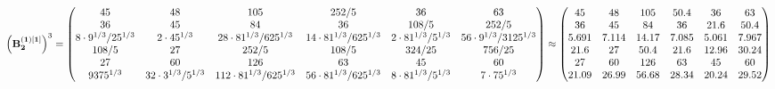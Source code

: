 \documentclass[10pt,a4paper]{article}
\begin{document}
	\[
		\left(\bold{B_2^{(1)[1]}}\right)^{3} = 
		\begin{pmatrix}
			{{45}}{} & {{48}}{} & {{105}}{} & {{252}} / {{5}} & {{36}}{} & {{63}}{} \\
			{{36}}{} & {{45}}{} & {{84}}{} & {{36}}{} & {{108}} / {{5}} & {{252}} / {{5}} \\
			{{8} \cdot {9^ {1 / 3}}} / {{25^ {1 / 3}}} & {{2} \cdot {45^ {1 / 3}}}{} & {{28} \cdot {81^ {1 / 3}}} / {{625^ {1 / 3}}} & {{14} \cdot {81^ {1 / 3}}} / {{625^ {1 / 3}}} & {{2} \cdot {81^ {1 / 3}}} / {{5^ {1 / 3}}} & {{56} \cdot {9^ {1 / 3}}} / {{3125^ {1 / 3}}} \\
			{{108}} / {{5}} & {{27}}{} & {{252}} / {{5}} & {{108}} / {{5}} & {{324}} / {{25}} & {{756}} / {{25}} \\
			{{27}}{} & {{60}}{} & {{126}}{} & {{63}}{} & {{45}}{} & {{60}}{} \\
			{{9375^ {1 / 3}}}{} & {{32} \cdot {3^ {1 / 3}}} / {{5^ {1 / 3}}} & {{112} \cdot {81^ {1 / 3}}} / {{625^ {1 / 3}}} & {{56} \cdot {81^ {1 / 3}}} / {{625^ {1 / 3}}} & {{8} \cdot {81^ {1 / 3}}} / {{5^ {1 / 3}}} & {{7} \cdot {75^ {1 / 3}}}{} \\
		\end{pmatrix}
		\approx
		\begin{pmatrix}
			45       & 48       & 105      & 50.4     & 36       & 63       \\
			36       & 45       & 84       & 36       & 21.6     & 50.4     \\
			5.691    & 7.114    & 14.17    & 7.085    & 5.061    & 7.967    \\
			21.6     & 27       & 50.4     & 21.6     & 12.96    & 30.24    \\
			27       & 60       & 126      & 63       & 45       & 60       \\
			21.09    & 26.99    & 56.68    & 28.34    & 20.24    & 29.52    \\
		\end{pmatrix}
	\]
\end{document}
